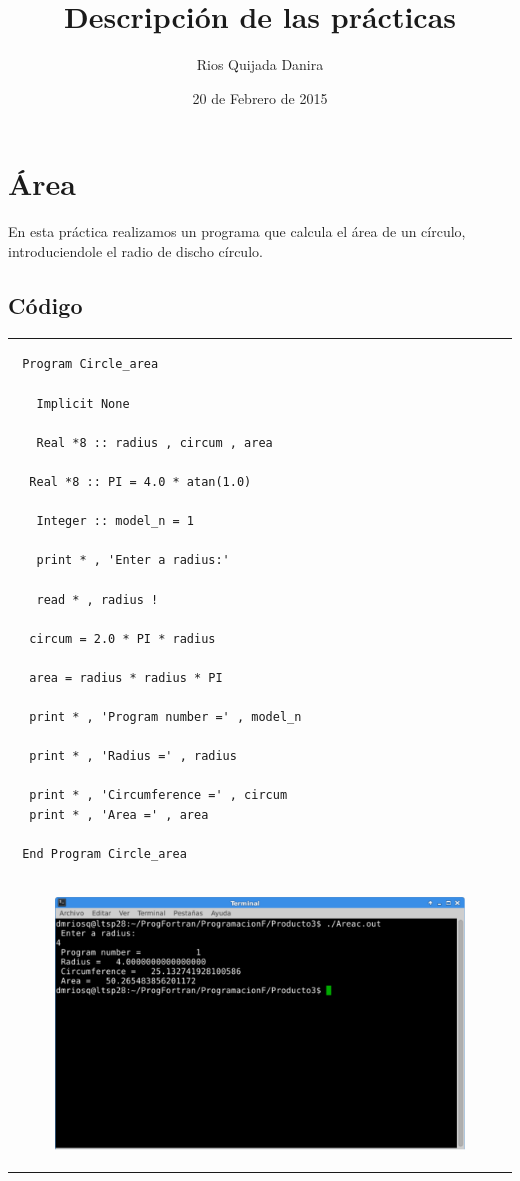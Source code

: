 \documentclass[10pt]{article}
\title{Descripción de las prácticas}
\author{Rios Quijada Danira}
\date{20 de Febrero de 2015}
\begin{document}
\maketitle
\section{Área}
En esta práctica realizamos un programa que calcula el área de un círculo, introduciendole el radio de discho círculo.

\subsection{Código}
\begin{tabular}{l}
\begin{verbatim}  
 Program Circle_area 

   Implicit None 

   Real *8 :: radius , circum , area 

  Real *8 :: PI = 4.0 * atan(1.0) 

   Integer :: model_n = 1 

   print * , 'Enter a radius:' 

   read * , radius !

  circum = 2.0 * PI * radius 

  area = radius * radius * PI 

  print * , 'Program number =' , model_n 

  print * , 'Radius =' , radius 

  print * , 'Circumference =' , circum 
  print * , 'Area =' , area 

 End Program Circle_area
\end{verbatim} \\

\begin{figure}
  \centering
    \includegraphics[scale=0.4]{A}
\end{figure}
\end{tabular}
\end{document}
